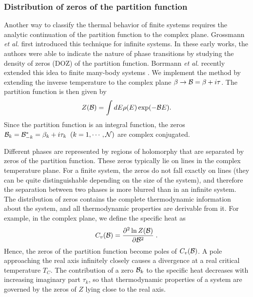 \documentclass[rmp,aps,floatfix]{revtex4}
\begin{document}
\subsubsection{Distribution of zeros of the partition function}

\label{subsec:doz}

Another way to classify the thermal behavior of finite systems 
requires the analytic continuation of the partition function to the
complex plane. Grossmann {\it et al.} \cite{gr67,gr69,gl69} first 
introduced this technique for infinite systems. In these early works,
the authors were able to indicate the nature of phase transitions 
by studying the density of zeros (DOZ) of the partition function. 
Borrmann {\it et al.} recently extended this idea to finite many-body
systems \cite{bmh00}. We implement the method by extending 
the inverse temperature to the complex plane $\beta \rightarrow {\cal B}=
\beta +i\tau$. The partition function is then given by
\begin{equation}
Z({\cal B})= \int dE \rho(E) \exp(-{\cal B}E).
\end{equation}
Since the partition function is an integral function, the zeros 
${\cal B}_k = {\cal B}_{-k}^*=\beta_k + i\tau_k \;\; (k =1,\cdots, {\cal N})$
are complex conjugated. 

Different phases are represented by regions of holomorphy that are
separated by zeros of the partition function. These zeros typically lie
on lines in the complex temperature plane. For a finite system, the zeros
do not fall exactly on lines (they can be quite distinguishable depending
on the size of the system), and therefore the separation between two 
phases is more blurred than in an infinite system. The distribution of zeros
contains the complete thermodynamic information about the system, and 
all thermodynamic properties are derivable from it. For example, in the
complex plane, we define the specific heat as
\begin{equation}
C_v({\cal B})=\frac{\partial^2 \ln Z({\cal B})}{\partial {\cal B}^2}\;.
\end{equation}
Hence, the zeros of the partition function become poles of $C_v({\cal B})$. 
A pole approaching the real axis  infinitely closely causes a divergence
at a real critical temperature $T_C$. The contribution of a zero ${\cal B}_k$
to the specific heat decreases with increasing imaginary part $\tau_k$, so 
that thermodynamic properties of a system are governed by the zeros of 
$Z$ lying close to the real axis. 
\end{document}
